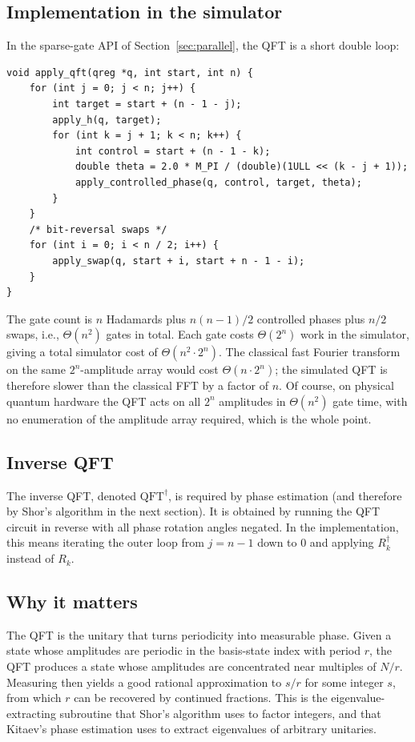 \subsection{Implementation in the simulator}

In the sparse-gate API of Section~\ref{sec:parallel}, the QFT is a short double loop:

\begin{lstlisting}[caption={QFT on $n$ qubits starting at register offset \texttt{start}.}]
void apply_qft(qreg *q, int start, int n) {
    for (int j = 0; j < n; j++) {
        int target = start + (n - 1 - j);
        apply_h(q, target);
        for (int k = j + 1; k < n; k++) {
            int control = start + (n - 1 - k);
            double theta = 2.0 * M_PI / (double)(1ULL << (k - j + 1));
            apply_controlled_phase(q, control, target, theta);
        }
    }
    /* bit-reversal swaps */
    for (int i = 0; i < n / 2; i++) {
        apply_swap(q, start + i, start + n - 1 - i);
    }
}
\end{lstlisting}

The gate count is $n$ Hadamards plus $n(n-1)/2$ controlled phases plus $n/2$ swaps, i.e., $\Theta(n^2)$ gates in total. Each gate costs $\Theta(2^n)$ work in the simulator, giving a total simulator cost of $\Theta(n^2 \cdot 2^n)$. The classical fast Fourier transform on the same $2^n$-amplitude array would cost $\Theta(n\cdot 2^n)$; the simulated QFT is therefore slower than the classical FFT by a factor of $n$. Of course, on physical quantum hardware the QFT acts on all $2^n$ amplitudes in $\Theta(n^2)$ gate time, with no enumeration of the amplitude array required, which is the whole point.

\subsection{Inverse QFT}

The inverse QFT, denoted $\mathrm{QFT}^\dagger$, is required by phase estimation (and therefore by Shor's algorithm in the next section). It is obtained by running the QFT circuit in reverse with all phase rotation angles negated. In the implementation, this means iterating the outer loop from $j = n-1$ down to $0$ and applying $R_k^\dagger$ instead of $R_k$.

\subsection{Why it matters}

The QFT is the unitary that turns periodicity into measurable phase. Given a state whose amplitudes are periodic in the basis-state index with period $r$, the QFT produces a state whose amplitudes are concentrated near multiples of $N/r$. Measuring then yields a good rational approximation to $s/r$ for some integer $s$, from which $r$ can be recovered by continued fractions. This is the eigenvalue-extracting subroutine that Shor's algorithm uses to factor integers, and that Kitaev's phase estimation uses to extract eigenvalues of arbitrary unitaries.
